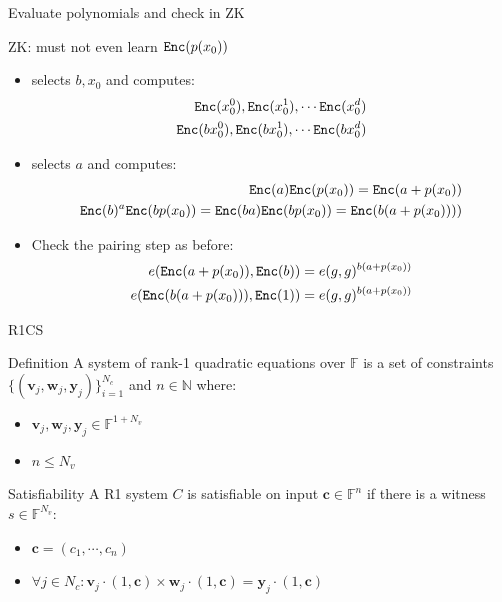 \documentclass[handout]{beamer}
\begin{document}
\begin{frame}{Evaluate polynomials and check in ZK}
\begin{small}
ZK: \ver must not even learn $\mathtt{Enc}(p(x_0))$  \pause
\begin{itemize}
    \item \ver selects $b,x_0$ and computes:   \begin{align*}
        \mathtt{Enc}(x_0^0),\mathtt{Enc}(x_0^1),\cdots \mathtt{Enc}(x_0^d)    \\
         \mathtt{Enc}(bx_0^0),\mathtt{Enc}(bx_0^1),\cdots \mathtt{Enc}(bx_0^d) \end{align*} \pause
    \item \prv selects $a$ and computes:  \pause
        \begin{align*}
        \mathtt{Enc}(a)\mathtt{Enc}(p(x_0)) = \mathtt{Enc}(a+p(x_0)) \\
        \mathtt{Enc}(b)^a \mathtt{Enc}(bp(x_0)) = \mathtt{Enc}(ba)\mathtt{Enc}(bp(x_0)) = \mathtt{Enc}(b(a+p(x_0))))
        \end{align*} \pause
    \item Check the pairing step as before:
        \begin{align*}
        e(\mathtt{Enc}(a+p(x_0)),\mathtt{Enc}(b))=e(g,g)^{b(a+p(x_0))} \\
        e(\mathtt{Enc}(b(a+p(x_0))),\mathtt{Enc}(1))=e(g,g)^{b(a+p(x_0))} 
        \end{align*}
\end{itemize}
\end{small}
\end{frame}

\begin{frame}{R1CS}

\begin{block}{Definition}
A system of rank-1 quadratic equations over $\mathbb{F}$ is a set of constraints $\{ (\bm{v}_j, \bm{w}_j, \bm{y}_j) \}_{i=1}^{N_c} $ and $n \in \mathbb{N}$ where:
\begin{itemize}
    \item $\bm{v}_j,\bm{w}_j,\bm{y}_j \in \mathbb{F}^{1+N_v}$
    \item $n \leq N_v$
\end{itemize}
\end{block}
\pause
\begin{block}{Satisfiability}
A R1 system $C$ is satisfiable on input $\bm{c} \in \mathbb{F}^n$ if there is a witness $s \in \mathbb{F}^{N_v}:$
\begin{itemize}
    \item $\bm{c} = (c_1, \cdots, c_n)$
    \item $\forall j \in N_c:  \bm{v}_j \cdotp (1,\bm{c})  \times  \bm{w}_j \cdotp (1,\bm{c})  =  \bm{y}_j \cdotp (1,\bm{c})$
\end{itemize}
\end{block}  
\end{frame}
\end{document}
